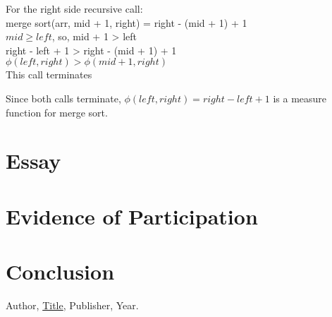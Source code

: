 \documentclass{article}
\theoremstyle{theorem}
\theoremstyle{definition}
\theoremstyle{remark}
\begin{document}
For the right side recursive call:\\
merge sort(arr, mid + 1, right) = right - (mid + 1) + 1\\
$mid \ge left$, so, mid + 1 > left\\
right - left + 1 > right - (mid + 1) + 1 \\
$\phi(left, right) > \phi(mid + 1, right)$\\
This call terminates

Since both calls terminate, $\phi(left, right) = right - left + 1$ is a measure function for merge sort.

\section{Essay}

\section{Evidence of Participation}

\section{Conclusion}\label{conclusion}

\begin{thebibliography}{99}
 Author, \href{https://en.wikipedia.org/wiki/LaTeX}{Title}, Publisher, Year.
\end{thebibliography}
\end{document}
